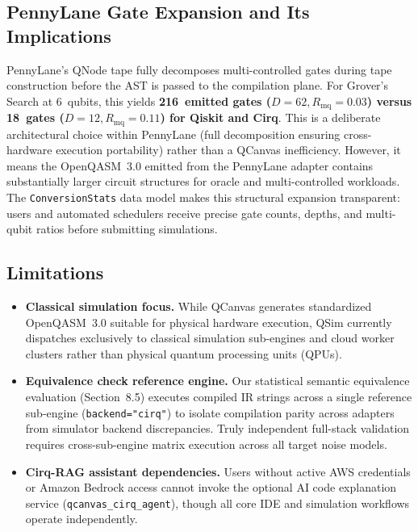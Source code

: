 \documentclass[runningheads]{llncs}
\begin{document}
\subsection{PennyLane Gate Expansion and Its Implications}

PennyLane's QNode tape fully decomposes multi-controlled gates during tape construction before the AST is passed to the compilation plane. For Grover's Search at 6~qubits, this yields \textbf{216~emitted gates ($D=62, R_{\text{mq}}=0.03$) versus 18~gates ($D=12, R_{\text{mq}}=0.11$) for Qiskit and Cirq}. This is a deliberate architectural choice within PennyLane (full decomposition ensuring cross-hardware execution portability) rather than a QCanvas inefficiency. However, it means the OpenQASM~3.0 emitted from the PennyLane adapter contains substantially larger circuit structures for oracle and multi-controlled workloads. The \texttt{ConversionStats} data model makes this structural expansion transparent: users and automated schedulers receive precise gate counts, depths, and multi-qubit ratios before submitting simulations.

\subsection{Limitations}

\begin{itemize}
    \item \textbf{Classical simulation focus.} While QCanvas generates standardized OpenQASM~3.0 suitable for physical hardware execution, QSim currently dispatches exclusively to classical simulation sub-engines and cloud worker clusters rather than physical quantum processing units (QPUs).
    \item \textbf{Equivalence check reference engine.} Our statistical semantic equivalence evaluation (Section~8.5) executes compiled IR strings across a single reference sub-engine (\texttt{backend="cirq"}) to isolate compilation parity across adapters from simulator backend discrepancies. Truly independent full-stack validation requires cross-sub-engine matrix execution across all target noise models.
    \item \textbf{Cirq-RAG assistant dependencies.} Users without active AWS credentials or Amazon Bedrock access cannot invoke the optional AI code explanation service (\texttt{qcanvas\_cirq\_agent}), though all core IDE and simulation workflows operate independently.
\end{itemize}
\end{document}
